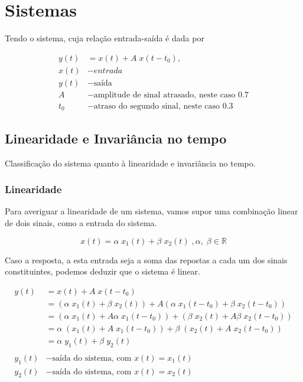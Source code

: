 \documentclass[12pt,a4paper]{article}
\begin{document}
\newpage

\section{Sistemas}

Tendo o sistema, cuja relação entrada-saída é dada por

\begin{equation}
	\begin{split}
		y(t) &= x(t) + A \; x(t-t_0), \\
		x(t) &- entrada \\		
		y(t) &- \text{saída}	\\
		A &- \text{amplitude de sinal atrasado, neste caso 0.7} \\
		t_0 &- \text{atraso do segundo sinal, neste caso 0.3}
	\end{split}
\end{equation}

\subsection{Linearidade e Invariância no tempo}
Classificação do sistema quanto à linearidade e invariância no tempo.

\subsubsection{Linearidade}
Para averiguar a linearidade de um sistema, vamos supor uma combinação linear
de dois sinais, como a entrada do sistema.

\begin{equation}
	x(t) = \alpha \; x_1(t) + \beta \; x_2(t) \;, \alpha, \; \beta \in \mathbb{R}
\end{equation}

Caso a resposta, a esta entrada seja a soma das repostas a cada um dos sinais constituintes, podemos deduzir que o sistema é linear.

\begin{equation}
	\begin{split}
		y(t) &= x(t) + A \; x(t - t_0) \\
		&= (\alpha \; x_1(t) + \beta \; x_2(t)) + A
		(\alpha \; x_1(t-t_0) + \beta \; x_2(t-t_0)) \\
		&= (\alpha \; x_1(t) + A \alpha \; x_1(t-t_0)) + 
		(\beta \; x_2(t) + A \beta \; x_2(t-t_0)) \\
		&= \alpha \; (x_1(t) + A \; x_1(t-t_0)) + 
		\beta \; (x_2(t) + A \; x_2(t-t_0)) \\
		&= \alpha \; y_1(t) + \beta \; y_2(t) \\ \\
		y_1(t) &- \text{saída do sistema, com }x(t) = x_1(t) \\
		y_2(t) &- \text{saída do sistema, com }x(t) = x_2(t)
	\end{split}
\end{equation}
\end{document}
